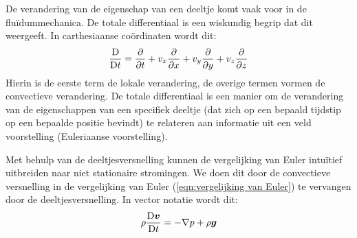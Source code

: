 De verandering van de eigenschap van een deeltje komt vaak voor in de fluïdummechanica. De totale differentiaal is een wiskundig begrip dat dit weergeeft. In carthesiaanse coördinaten wordt dit:
\begin{equation}
	\frac{\mathrm{D}}{\mathrm{D} t} = \frac{\partial}{\partial t} + v_x \frac{\partial}{\partial x} + v_y \frac{\partial}{\partial y} + v_z \frac{\partial}{\partial z}
\end{equation}
Hierin is de eerste term de lokale verandering, de overige termen vormen de convectieve verandering. De totale differentiaal is een manier om de verandering van de eigenschappen van een specifiek deeltje (dat zich op een bepaald tijdstip op een bepaalde positie bevindt) te relateren aan informatie uit een veld voorstelling (Euleriaanse voorstelling).

Met behulp van de deeltjesversnelling kunnen de vergelijking van Euler intuïtief uitbreiden naar niet stationaire stromingen. We doen dit door de convectieve versnelling in de vergelijking van Euler (\ref{eqn:vergelijking van Euler}) te vervangen door de deeltjesversnelling. In vector notatie wordt dit:
\begin{equation}
	\rho \frac{\mathrm{D} \boldsymbol{v}}{\mathrm{D} t} = -\nabla p + \rho \boldsymbol{g}
\end{equation}

